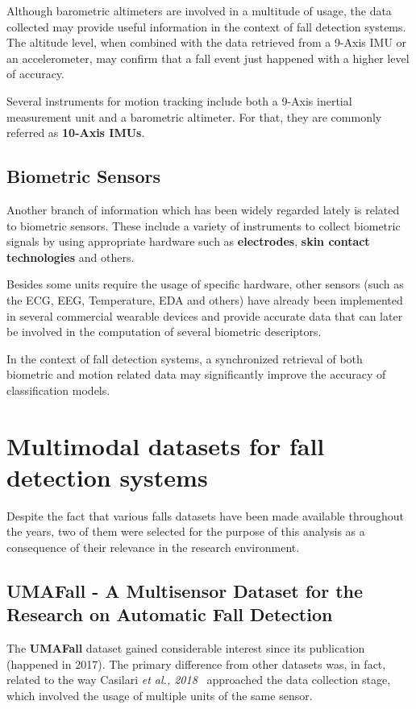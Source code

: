 Although barometric altimeters are involved in a multitude of usage, the data collected may provide useful information in the context of fall detection systems. The altitude level, when combined with the data retrieved from a 9-Axis IMU or an accelerometer, may confirm that a fall event just happened with a higher level of accuracy.

Several instruments for motion tracking include both a 9-Axis inertial measurement unit and a barometric altimeter. For that, they are commonly referred as \textbf{10-Axis IMUs}.

\subsection{Biometric Sensors}\label{subsec:biometric-sensors}

Another branch of information which has been widely regarded lately is related to biometric sensors. These include a variety of instruments to collect biometric signals by using appropriate hardware such as \textbf{electrodes}, \textbf{skin contact technologies} and others.

Besides some units require the usage of specific hardware, other sensors (such as the ECG, EEG, Temperature, EDA and others) have already been implemented in several commercial wearable devices and provide accurate data that can later be involved in the computation of several biometric descriptors. 

In the context of fall detection systems, a synchronized retrieval of both biometric and motion related data may significantly improve the accuracy of classification models.

\section{Multimodal datasets for fall detection systems}\label{sec:datasets}

Despite the fact that various falls datasets have been made available throughout the years, two of them were selected for the purpose of this analysis as a consequence of their relevance in the research environment.

\subsection{UMAFall - A Multisensor Dataset for the Research on Automatic Fall Detection}\label{subsec:umafall}

The \textbf{UMAFall} dataset gained considerable interest since its publication (happened in 2017). The primary difference from other datasets was, in fact, related to the way Casilari \textit{et al., 2018}~\cite{umafall} approached the data collection stage, which involved the usage of multiple units of the same sensor. 

